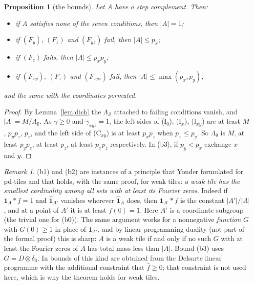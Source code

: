 \documentclass[11pt,a4paper]{amsart}
\newtheorem{proposition}[theorem]{Proposition}
\theoremstyle{definition}
\theoremstyle{remark}
\newtheorem{remark}[theorem]{Remark}
\newcommand{\one}{\mathbf{1}}
\begin{document}
\begin{proposition}[the bounds]\label{prop:bounds}
Let $A$ have a step complement. Then:
\begin{itemize}
\item[\textup{(b0)}] if $A$ satisfies none of the seven conditions, then $|A|=1$;
\item[\textup{(b1)}] if $(F_y)$, $(F_z)$ and $(F_{yz})$ fail, then $|A|\le p_x$;
\item[\textup{(b2)}] if $(F_z)$ fails, then $|A|\le p_xp_y$;
\item[\textup{(b3)}] if $(F_{xy})$, $(F_z)$ and $(F_{xyz})$ fail, then $|A|\le\max(p_x,p_y)$;
\end{itemize}
and the same with the coordinates permuted.
\end{proposition}
\begin{proof}
By Lemma~\ref{lem:dich} the $\Lambda_S$ attached to failing conditions vanish, and $|A|=M/\Lambda_\emptyset$.
As $\gamma\ge0$ and $\gamma_{xyz}=1$, the left sides of (I$_0$), (I$_x$), (I$_{xy}$) are at least $M$, $p_yp_z$,
$p_z$, and the left side of (C$_{xy}$) is at least $p_xp_z$ when $p_x\le p_y$. So $\Lambda_\emptyset$ is
$M$, at least $p_yp_z$, at least $p_z$, at least $p_xp_z$ respectively. In (b3), if $p_y<p_x$ exchange $x$ and $y$.
\end{proof}

\begin{remark}\label{rem:dual}
(b1) and (b2) are instances of a principle that Yonder formulated for pd-tiles and that holds, with the same
proof, for weak tiles: \emph{a weak tile has the smallest cardinality among all sets with at least its Fourier
zeros}. Indeed if $\one_A*f=1$ and $\hat{\one}_{A'}$ vanishes wherever
$\hat{\one}_A$ does, then $\one_{A'}*f$ is the constant $|A'|/|A|$, and at a point of $A'$ it is at least
$f(0)=1$. Here $A'$ is a coordinate subgroup (the trivial one for (b0)). The same argument works for a nonnegative \emph{function} $G$ with
$G(0)\ge1$ in place of $\one_{A'}$, and by linear programming duality (not part of the formal proof) this is
sharp: $A$ is a weak tile if and
only if no such $G$ with at least the Fourier zeros of $A$ has total mass less than $|A|$. Bound (b3) uses
$G=D\otimes\delta_0$. In \cite{KLMS,KF} bounds of this kind are obtained from the Delsarte linear programme with
the additional constraint that $\hat f\ge 0$; that constraint is not used here, which is why the theorem holds
for weak tiles.
\end{remark}
\end{document}

